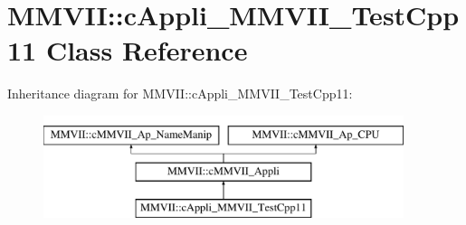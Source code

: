 \hypertarget{classMMVII_1_1cAppli__MMVII__TestCpp11}{}\section{M\+M\+V\+II\+:\+:c\+Appli\+\_\+\+M\+M\+V\+I\+I\+\_\+\+Test\+Cpp11 Class Reference}
\label{classMMVII_1_1cAppli__MMVII__TestCpp11}
Inheritance diagram for M\+M\+V\+II\+:\+:c\+Appli\+\_\+\+M\+M\+V\+I\+I\+\_\+\+Test\+Cpp11\+:\begin{figure}[H]
\begin{center}
\leavevmode
\includegraphics[height=3.000000cm]{classMMVII_1_1cAppli__MMVII__TestCpp11}
\end{center}
\end{figure}
